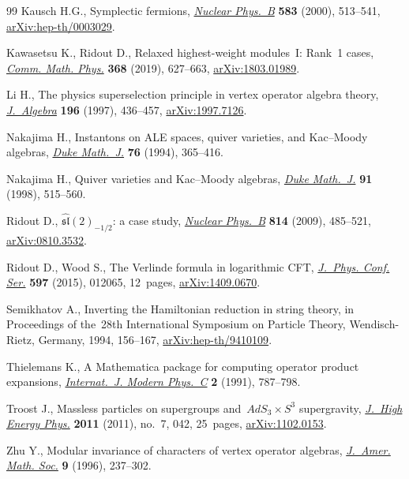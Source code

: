\documentclass[pdftex]{sigma}
\numberwithin{equation}{section}
\begin{document}
\begin{thebibliography}{99}
Kausch H.G., Symplectic fermions,
 \href{https://doi.org/10.1016/S0550-3213(00)00295-9}{\textit{Nuclear
 Phys.~B}} \textbf{583} (2000), 513--541,
 \href{http://arxiv.org/abs/hep-th/0003029}{arXiv:hep-th/0003029}.

Kawasetsu K., Ridout D., Relaxed highest-weight modules~{I}: {R}ank~1 cases,
 \href{https://doi.org/10.1007/s00220-019-03305-x}{\textit{Comm. Math. Phys.}}
 \textbf{368} (2019), 627--663,
 \href{http://arxiv.org/abs/1803.01989}{arXiv:1803.01989}.

Li H., The physics superselection principle in vertex operator algebra theory,
 \href{https://doi.org/10.1006/jabr.1997.7126}{\textit{J.~Algebra}}
 \textbf{196} (1997), 436--457,
 \href{http://arxiv.org/abs/1997.7126}{arXiv:1997.7126}.

Nakajima H., Instantons on {ALE} spaces, quiver varieties, and {K}ac--{M}oody
 algebras, \href{https://doi.org/10.1215/S0012-7094-94-07613-8}{\textit{Duke
 Math.~J.}} \textbf{76} (1994), 365--416.

Nakajima H., Quiver varieties and {K}ac--{M}oody algebras,
 \href{https://doi.org/10.1215/S0012-7094-98-09120-7}{\textit{Duke Math.~J.}}
 \textbf{91} (1998), 515--560.

Ridout D., {$\widehat{\mathfrak{sl}}(2)_{-1/2}$}: a case study,
 \href{https://doi.org/10.1016/j.nuclphysb.2009.01.008}{\textit{Nuclear
 Phys.~B}} \textbf{814} (2009), 485--521,
 \href{http://arxiv.org/abs/0810.3532}{arXiv:0810.3532}.

Ridout D., Wood S., The {V}erlinde formula in logarithmic {CFT},
 \href{https://doi.org/10.1088/1742-6596/597/1/012065}{\textit{J.~Phys. Conf.
 Ser.}} \textbf{597} (2015), 012065, 12~pages,
 \href{http://arxiv.org/abs/1409.0670}{arXiv:1409.0670}.

Semikhatov A., Inverting the {H}amiltonian reduction in string theory, in
 Proceedings of the~28th {I}nternational {S}ymposium on {P}article {T}heory,
 Wendisch-Rietz, Germany, 1994, 156--167,
 \href{http://arxiv.org/abs/hep-th/9410109}{arXiv:hep-th/9410109}.

Thielemans K., A {M}athematica package for computing operator product
 expansions,
 \href{https://doi.org/10.1142/S0129183191001001}{\textit{Internat.~J. Modern
 Phys.~C}} \textbf{2} (1991), 787--798.

Troost J., Massless particles on supergroups and~{$AdS_3\times S^3$}
 supergravity, \href{https://doi.org/10.1007/JHEP07(2011)042}{\textit{J.~High
 Energy Phys.}} \textbf{2011} (2011), no.~7, 042, 25~pages,
 \href{http://arxiv.org/abs/1102.0153}{arXiv:1102.0153}.

Zhu Y., Modular invariance of characters of vertex operator algebras,
 \href{https://doi.org/10.1090/S0894-0347-96-00182-8}{\textit{J.~Amer. Math.
 Soc.}} \textbf{9} (1996), 237--302.

\end{thebibliography}\LastPageEnding
\end{document}
